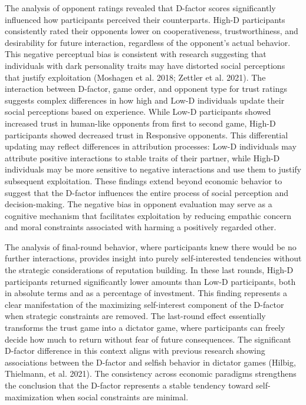 \documentclass[
]{article}
\begin{document}
The analysis of opponent ratings revealed that D-factor scores significantly influenced how participants perceived their counterparts.
High-D participants consistently rated their opponents lower on cooperativeness, trustworthiness, and desirability for future interaction, regardless of the opponent's actual behavior.
This negative perceptual bias is consistent with research suggesting that individuals with dark personality traits may have distorted social perceptions that justify exploitation (Moshagen et al. 2018; Zettler et al. 2021).
The interaction between D-factor, game order, and opponent type for trust ratings suggests complex differences in how high and Low-D individuals update their social perceptions based on experience.
While Low-D participants showed increased trust in human-like opponents from first to second game, High-D participants showed decreased trust in Responsive opponents.
This differential updating may reflect differences in attribution processes: Low-D individuals may attribute positive interactions to stable traits of their partner, while High-D individuals may be more sensitive to negative interactions and use them to justify subsequent exploitation.
These findings extend beyond economic behavior to suggest that the D-factor influences the entire process of social perception and decision-making.
The negative bias in opponent evaluation may serve as a cognitive mechanism that facilitates exploitation by reducing empathic concern and moral constraints associated with harming a positively regarded other.

The analysis of final-round behavior, where participants knew there would be no further interactions, provides insight into purely self-interested tendencies without the strategic considerations of reputation building.
In these last rounds, High-D participants returned significantly lower amounts than Low-D participants, both in absolute terms and as a percentage of investment.
This finding represents a clear manifestation of the maximizing self-interest component of the D-factor when strategic constraints are removed.
The last-round effect essentially transforms the trust game into a dictator game, where participants can freely decide how much to return without fear of future consequences.
The significant D-factor difference in this context aligns with previous research showing associations between the D-factor and selfish behavior in dictator games (Hilbig, Thielmann, et al. 2021).
The consistency across economic paradigms strengthens the conclusion that the D-factor represents a stable tendency toward self-maximization when social constraints are minimal.
\end{document}
